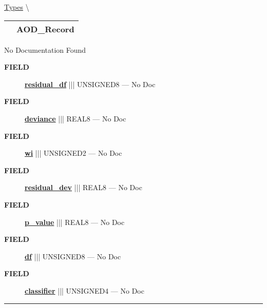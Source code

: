 \hypertarget{ecldoc:logisticregression.types.aod_record}{}
\hspace{0pt} \hyperlink{ecldoc:LogisticRegression.Types}{Types} \textbackslash 

{\renewcommand{\arraystretch}{1.5}
\begin{tabularx}{\textwidth}{|>{\raggedright\arraybackslash}l|X|}
\hline
\hspace{0pt}\mytexttt{\color{red} } & \textbf{AOD\_Record} \\
\hline
\end{tabularx}
}

\par





No Documentation Found







\par
\begin{description}
\item [\colorbox{tagtype}{\color{white} \textbf{\textsf{FIELD}}}] \textbf{\underline{residual\_df}} ||| UNSIGNED8 --- No Doc
\item [\colorbox{tagtype}{\color{white} \textbf{\textsf{FIELD}}}] \textbf{\underline{deviance}} ||| REAL8 --- No Doc
\item [\colorbox{tagtype}{\color{white} \textbf{\textsf{FIELD}}}] \textbf{\underline{wi}} ||| UNSIGNED2 --- No Doc
\item [\colorbox{tagtype}{\color{white} \textbf{\textsf{FIELD}}}] \textbf{\underline{residual\_dev}} ||| REAL8 --- No Doc
\item [\colorbox{tagtype}{\color{white} \textbf{\textsf{FIELD}}}] \textbf{\underline{p\_value}} ||| REAL8 --- No Doc
\item [\colorbox{tagtype}{\color{white} \textbf{\textsf{FIELD}}}] \textbf{\underline{df}} ||| UNSIGNED8 --- No Doc
\item [\colorbox{tagtype}{\color{white} \textbf{\textsf{FIELD}}}] \textbf{\underline{classifier}} ||| UNSIGNED4 --- No Doc
\end{description}





\rule{\linewidth}{0.5pt}


